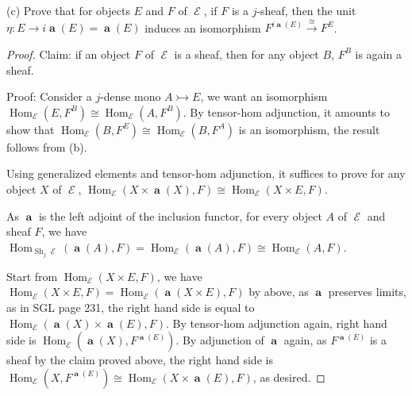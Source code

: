 \documentclass[a4paper]{article}
\DeclareMathOperator{\Hom}{\text {Hom}}
\DeclareMathOperator{\Sh}{\text {Sh}}
\DeclareMathOperator{\E}{\mathcal E}
\DeclareMathOperator{\abf}{\mathbf a}
\begin{document}
(c) Prove that for objects $E$ and $F$ of $\E$, if $F$ is a $j$-sheaf, then the unit $\eta:E\to i\abf(E)=\abf(E)$ induces an isomorphism $F^{i\abf(E)}\overset{\cong}\to  F^E$.
\begin{proof}
    Claim: if an object $F$ of $\E$ is a sheaf, then for any object $B$, $F^B$ is again a sheaf.

    Proof: Consider a $j$-dense mono $A\rightarrowtail E$, we want an isomorphism $\Hom_{\E}(E,F^B)\cong \Hom_{\E}(A,F^B)$. By tensor-hom adjunction, it amounts to show that $\Hom_{\E}(B,F^E)\cong \Hom_{\E}(B,F^A)$ is an isomorphism,  the result follows from (b).

    Using generalized elements and tensor-hom adjunction, it suffices to prove for any object $X$ of $\E$, $\Hom_{\E}(X\times \abf (X),F)\cong \Hom_{\E}(X\times E,F)$.

    As $\abf$ is the left adjoint of the inclusion functor, for every object $A$ of $\E$ and sheaf $F$, we have $\Hom_{\Sh_j\E}(\abf(A),F)=\Hom_{\E}(\abf(A),F)\cong \Hom_{\E}(A,F)$.

    Start from $\Hom_{\E}(X\times E,F)$, we have $\Hom_{\E}(X\times E,F)= \Hom_{\E}(\abf(X\times E),F)$ by above, as $\abf$ preserves limits, as in SGL page 231, the right hand side is equal to $ \Hom_{\E}(\abf(X)\times\abf (E),F)$. By tensor-hom adjunction again, right hand side is $ \Hom_{\E}(\abf(X),F^{\abf (E)})$. By adjunction of $\abf$ again, as $F^{\abf(E)}$ is a sheaf by the claim proved above, the right hand side is $ \Hom_{\E}(X,F^{\abf (E)})\cong  \Hom_{\E}(X\times \abf (E),F)$, as desired.
\end{proof}
\end{document}
